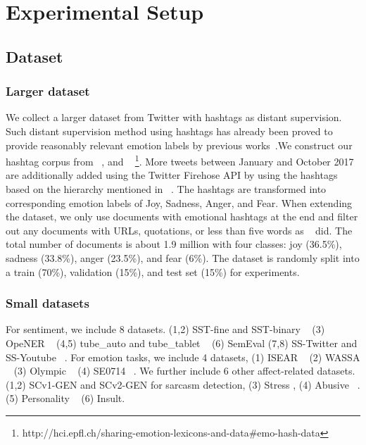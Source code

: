 \documentclass[11pt,a4paper]{article}
\begin{document}
\section{Experimental Setup}
\subsection{Dataset}


\subsubsection*{Larger dataset} We collect a larger dataset from Twitter with hashtags as distant supervision. Such distant supervision method using hashtags has already been proved to provide reasonably relevant emotion labels by previous works~\cite{Wang2012}.We construct our hashtag corpus from ~,  and ~ \footnote{http://hci.epfl.ch/sharing-emotion-lexicons-and-data\#emo-hash-data}. More tweets between January and October 2017 are additionally added using the Twitter Firehose API by using the hashtags based on the hierarchy mentioned in ~. The hashtags are transformed into corresponding emotion labels of Joy, Sadness, Anger, and Fear.  When extending the dataset, we only use documents with emotional hashtags at the end and filter out any documents with URLs, quotations, or less than five words as ~ did. The total number of documents is about 1.9 million with four classes: joy (36.5\%), sadness (33.8\%), anger (23.5\%), and fear (6\%). The dataset is randomly split into a train (70\%), validation (15\%), and test set  (15\%) for experiments. 

  
\subsubsection*{Small datasets}
For sentiment, we include 8 datasets. (1,2) SST-fine and SST-binary ~\cite{socher2013recursive} (3) OpeNER ~\cite{agerri2013opener} (4,5) tube\_auto and tube\_tablet ~\cite{uryupina2014sentube}  (6) SemEval \cite{hltcoe2013semeval} (7,8) SS-Twitter and SS-Youtube ~\cite{Thelwall2010}. For emotion tasks, we include 4 datasets, (1) ISEAR ~\cite{Wallbott1986} (2) WASSA ~\cite{Mohammad2017} (3) Olympic ~ (4) SE0714 ~\cite{staiano2014depechemood}. We further include 6 other affect-related datasets. (1,2) SCv1-GEN and SCv2-GEN for sarcasm detection, (3) Stress \cite{winata2018attention},  (4) Abusive ~\cite{waseem2016you,waseem2016hateful}. (5) Personality ~\cite{pennebaker1999linguistic} (6) Insult. 
\end{document}
